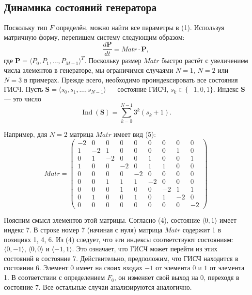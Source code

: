 \documentclass[a4paper,12pt]{article}
\begin{document}
\subsection{Динамика состояний генератора}

Поскольку тип $F$ определён, можно найти все параметры в (1). Используя матричную форму, перепишем систему следующим образом:
\begin{equation}
\frac{d\mathbf{P}}{dt} = Matr \cdot \mathbf{P}, \tag{3}
\end{equation}
где $\mathbf{P} = \langle P_0, P_1, \ldots, P_{M-1} \rangle^T$. Поскольку размер $Matr$ быстро растёт с увеличением числа элементов в генераторе, мы ограничимся случаями $N=1$, $N=2$ или $N=3$ в примерах. Прежде всего, необходимо проиндексировать все состояния ГИСЧ. Пусть $\mathbf{S} = \langle s_0, s_1, \ldots, s_{N-1} \rangle$ — состояние ГИСЧ, $s_k \in \{-1,0,1\}$. Индекс $\mathbf{S}$ — это число
\begin{equation}
\operatorname{Ind}(\mathbf{S}) = \sum_{k=0}^{N-1} 3^k (s_k + 1). \tag{4}
\end{equation}

Например, для $N=2$ матрица $Matr$ имеет вид (5):
\[
Matr = \left( \begin{array}{cccccccccc}
-2 & 0 & 0 & 0 & 0 & 0 & 0 & 0 & 0 \\
1 & -2 & 1 & 0 & 0 & 0 & 0 & 1 & 0 \\
0 & 1 & -2 & 0 & 0 & 1 & 0 & 0 & 1 \\
1 & 0 & 0 & -2 & 0 & 1 & 1 & 0 & 0 \\
0 & 0 & 0 & 0 & -2 & 0 & 0 & 0 & 0 \\
0 & 0 & 1 & 1 & 1 & -2 & 0 & 0 & 0 \\
0 & 0 & 0 & 1 & 0 & 0 & -2 & 1 & 1 \\
0 & 1 & 0 & 0 & 1 & 0 & 1 & -2 & 0 \\
0 & 0 & 0 & 0 & 0 & 0 & 0 & 0 & -2
\end{array} \right) \tag{5}
\]

Поясним смысл элементов этой матрицы. Согласно (4), состояние $\langle 0,1 \rangle$ имеет индекс 7. В строке номер 7 (начиная с нуля) матрица $Matr$ содержит 1 в позициях 1, 4, 6. Из (4) следует, что эти индексы соответствуют состояниям: $\langle 0,-1 \rangle$, $\langle 0,0 \rangle$ и $\langle -1,1 \rangle$. Это означает, что ГИСЧ может перейти из этих состояний в состояние 7. Действительно, предположим, что ГИСЧ находится в состоянии 6. Элемент 0 имеет на своих входах $-1$ от элемента 0 и $1$ от элемента 1. В соответствии с определением $F_0$, он изменяет свой выход на 0, переходя в состояние 7. Все остальные случаи анализируются аналогично.
\end{document}
